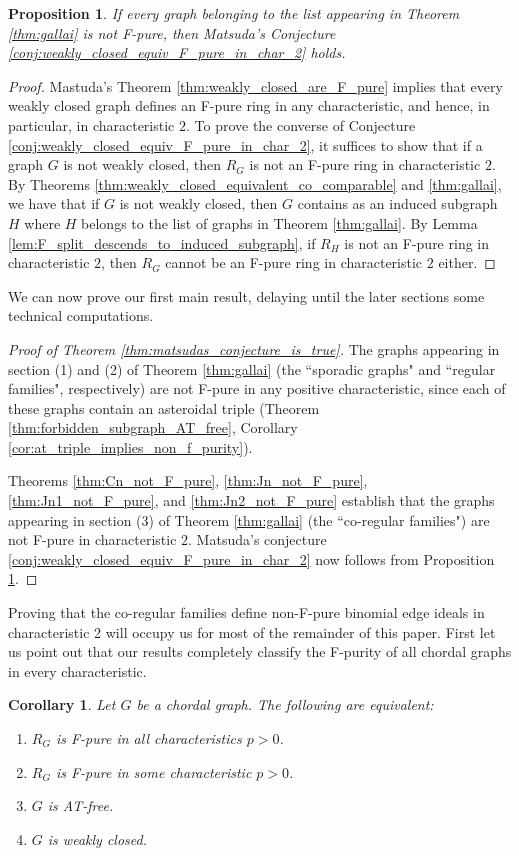 \documentclass[12pt,a4paper]{amsart}
\theoremstyle{plain}
\newtheorem{prop}[thrm]{Proposition}
\def\bprop{\begin{prop}}
\def\eprop{\end{prop}}
\newtheorem{cor}[thrm]{Corollary}
\theoremstyle{definition}
\def\bproof{\begin{proof}}
\def\eproof{\end{proof}}
\theoremstyle{remark}
\begin{document}
\bprop 
\label{prop:reduction_matsuda_to_finite_list}
If every graph belonging to the list appearing in Theorem \ref{thm:gallai} is not F-pure, then Matsuda's Conjecture \ref{conj:weakly_closed_equiv_F_pure_in_char_2} holds.
\eprop 

\bproof
Mastuda's Theorem \ref{thm:weakly_closed_are_F_pure} implies that every weakly closed graph defines an F-pure ring in any characteristic, and hence, in particular, in characteristic $2$. To prove the converse of Conjecture \ref{conj:weakly_closed_equiv_F_pure_in_char_2}, it suffices to show that if a graph $G$ is not weakly closed, then $R_{G}$ is not an F-pure ring in characteristic $2$. By Theorems \ref{thm:weakly_closed_equivalent_co_comparable} and \ref{thm:gallai}, we have that if $G$ is not weakly closed, then $G$ contains as an induced subgraph $H$ where $H$ belongs to the list of graphs in Theorem \ref{thm:gallai}. By Lemma \ref{lem:F_split_descends_to_induced_subgraph}, if $R_{H}$ is not an F-pure ring in characteristic $2$, then $R_{G}$ cannot be an F-pure ring in characteristic $2$ either.
\eproof

We can now prove our first main result, delaying until the later sections some technical computations.


\bproof[Proof of Theorem \ref{thm:matsudas_conjecture_is_true}]
The graphs appearing in section (1) and (2) of Theorem \ref{thm:gallai} (the ``sporadic graphs" and ``regular families", respectively)  are not F-pure in any positive characteristic, since each of these graphs contain an asteroidal triple (Theorem \ref{thm:forbidden_subgraph_AT_free}, Corollary \ref{cor:at_triple_implies_non_f_purity}). 

Theorems \ref{thm:Cn_not_F_pure}, \ref{thm:Jn_not_F_pure}, \ref{thm:Jn1_not_F_pure}, and \ref{thm:Jn2_not_F_pure} establish that the graphs appearing in section (3) of Theorem \ref{thm:gallai} (the ``co-regular families") are not F-pure in characteristic $2$. Matsuda's conjecture \ref{conj:weakly_closed_equiv_F_pure_in_char_2} now follows from Proposition \ref{prop:reduction_matsuda_to_finite_list}.
\eproof

Proving that the co-regular families define non-F-pure binomial edge ideals in characteristic 2 will occupy us for most of the remainder of this paper.  First let us point out that our results completely classify the F-purity of all chordal graphs in every characteristic.

\begin{cor}
\label{cor:char_F_pure_bei}
    Let $G$ be a chordal graph.  The following are equivalent:
    \begin{enumerate}
     \item $R_G$ is F-pure in all characteristics $p > 0$.
    \item $R_G$ is F-pure in some characteristic $p > 0$.
    \item $G$ is AT-free.
    \item $G$ is weakly closed.
    \end{enumerate}
\end{cor}
\end{document}
